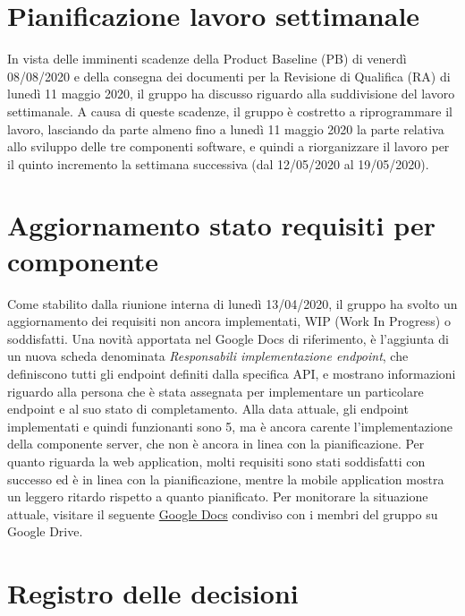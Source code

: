 \documentclass{article}
\begin{document}
\section{Pianificazione lavoro settimanale}%
\label{sec:pianificazione_lavoro_settimanale}
In vista delle imminenti scadenze della Product Baseline (PB) di venerdì 08/08/2020 e della consegna dei documenti per la Revisione di Qualifica (RA) di lunedì 11 maggio 2020, il gruppo ha discusso riguardo alla suddivisione del lavoro settimanale.
A causa di queste scadenze, il gruppo è costretto a riprogrammare il lavoro, lasciando da parte almeno fino a lunedì 11 maggio 2020 la parte relativa allo sviluppo delle tre componenti software, e quindi a riorganizzare il lavoro per il quinto incremento la settimana successiva (dal 12/05/2020 al 19/05/2020).

\section{Aggiornamento stato requisiti per componente}%
\label{sec:aggiornamento_stato_requisiti_per_componente}
Come stabilito dalla riunione interna di lunedì 13/04/2020, il gruppo ha svolto un aggiornamento dei requisiti non ancora implementati, WIP (Work In Progress) o soddisfatti.
Una novità apportata nel Google Docs di riferimento, è l'aggiunta di un nuova scheda denominata \textit{Responsabili implementazione endpoint}, che definiscono tutti gli endpoint definiti dalla specifica API, e mostrano informazioni riguardo alla persona che è stata assegnata per implementare un particolare endpoint e al suo stato di completamento.
Alla data attuale, gli endpoint implementati e quindi funzionanti sono 5, ma è ancora carente l'implementazione della componente server, che non è ancora in linea con la pianificazione.
Per quanto riguarda la web application, molti requisiti sono stati soddisfatti con successo ed è in linea con la pianificazione, mentre la mobile application mostra un leggero ritardo rispetto a quanto pianificato.
Per monitorare la situazione attuale, visitare il seguente \href{https://docs.google.com/spreadsheets/d/1J-RbNrb1yN_X1rVlKzpP9rjaiGst8B62k1K6EHY-grU/edit#gid=0}{Google Docs} condiviso con i membri del gruppo su Google Drive.

\newpage
\section{Registro delle decisioni}%
\label{sec:registro_delle_decisioni}
\end{document}
